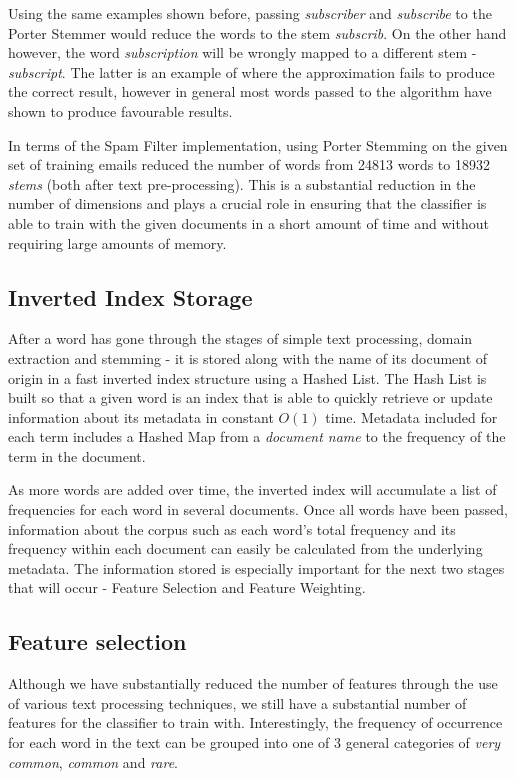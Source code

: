 Using the same examples shown before, passing \emph{subscriber} and \emph{subscribe} to the Porter Stemmer would reduce the words to the stem \emph{subscrib}. On the other hand however, the word \emph{subscription} will be wrongly mapped to a different stem - \emph{subscript}. The latter is an example of where the approximation fails to produce the correct result, however in general most words passed to the algorithm have shown to produce favourable results.

In terms of the Spam Filter implementation, using Porter Stemming on the given set of training emails reduced the number of words from 24813 words to 18932 \textit{stems} (both after text pre-processing). This is a substantial reduction in the number of dimensions and plays a crucial role in ensuring that the classifier is able to train with the given documents in a short amount of time and without requiring large amounts of memory.

\subsection{Inverted Index Storage}

After a word has gone through the stages of simple text processing, domain extraction and stemming - it is stored along with the name of its document of origin in a fast inverted index structure using a Hashed List. The Hash List is built so that a given word is an index that is able to quickly retrieve or update information about its metadata in constant $O(1)$ time. Metadata included for each term includes a Hashed Map from a \textit{document name} to the frequency of the term in the document.

As more words are added over time, the inverted index will accumulate a list of frequencies for each word in several documents. Once all words have been passed, information about the corpus such as each word's total frequency and its frequency within each document can easily be calculated from the underlying metadata. The information stored is especially important for the next two stages that will occur - Feature Selection and Feature Weighting.

\subsection{Feature selection}
Although we have substantially reduced the number of features through the use of various text processing techniques, we still have a substantial number of features for the classifier to train with. Interestingly, the frequency of occurrence for each word in the text can be grouped into one of 3 general categories of \textit{very common}, \textit{common} and \textit{rare}. 

